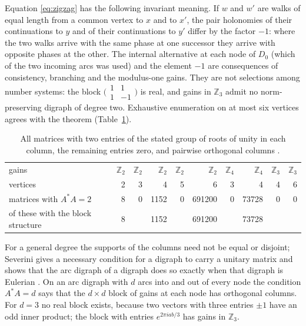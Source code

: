 Equation \eqref{eq:zigzag} has the following invariant meaning. If $w$ and $w'$ are walks of equal length from a common vertex to $x$ and to $x'$, the pair holonomies of their continuations to $y$ and of their continuations to $y'$ differ by the factor $-1$: where the two walks arrive with the same phase at one successor they arrive with opposite phases at the other. The internal alternative at each node of $D_0$ (which of the two incoming arcs was used) and the element $-1$ are consequences of consistency, branching and the modulus-one gains. They are not selections among number systems: the block $\bigl(\begin{smallmatrix}1&1\\1&-1\end{smallmatrix}\bigr)$ is real, and gains in $\mathbb{Z}_3$ admit no norm-preserving digraph of degree two. Exhaustive enumeration on at most six vertices agrees with the theorem (Table~\ref{tab:enum}).

\begin{table}[ht]\centering\small
\begin{tabular}{@{}lrrrrrrrrr@{}}\toprule
gains & $\mathbb{Z}_2$ & $\mathbb{Z}_2$ & $\mathbb{Z}_2$ & $\mathbb{Z}_2$ & $\mathbb{Z}_2$ & $\mathbb{Z}_4$ & $\mathbb{Z}_4$ & $\mathbb{Z}_3$ & $\mathbb{Z}_3$\\
vertices & 2 & 3 & 4 & 5 & 6 & 3 & 4 & 4 & 6\\\midrule
matrices with $A^*A=2$ & 8 & 0 & 1152 & 0 & 691200 & 0 & 73728 & 0 & 0\\
of these with the block structure & 8 & & 1152 & & 691200 & & 73728 & & \\\bottomrule
\end{tabular}
\caption{All matrices with two entries of the stated group of roots of unity in each column, the remaining entries zero, and pairwise orthogonal columns \cite{comp3}.}\label{tab:enum}
\end{table}

\begin{remark}
For a general degree the supports of the columns need not be equal or disjoint; Severini gives a necessary condition for a digraph to carry a unitary matrix and shows that the arc digraph of a digraph does so exactly when that digraph is Eulerian \cite{severini}. On an arc digraph with $d$ arcs into and out of every node the condition $A^*A=d$ says that the $d\times d$ block of gains at each node has orthogonal columns. For $d=3$ no real block exists, because two vectors with three entries $\pm1$ have an odd inner product; the block with entries $e^{2\pi i ab/3}$ has gains in $\mathbb{Z}_3$.
\end{remark}

